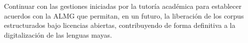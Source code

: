 Continuar con las gestiones iniciadas por la tutoría académica para establecer acuerdos con la ALMG que permitan, en un futuro, la liberación de los corpus estructurados bajo licencias abiertas, contribuyendo de forma definitiva a la digitalización de las lenguas mayas.














    
    
